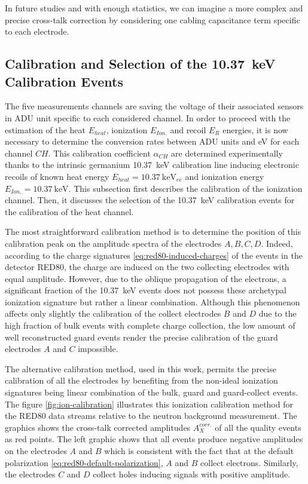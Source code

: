 In future studies and with enough statistics, we can imagine a more complex and precise cross-talk correction by considering one cabling capacitance term specific to each electrode.


\subsection{Calibration and Selection of the \SI{10.37}{\kilo\eV} Calibration Events}
\label{par:ion-calibration}
\label{par:heat-calibration}
\label{par:10kev-selection}

The five measurements channels are saving the voltage of their associated sensors in ADU unit specific to each considered channel. In order to proceed with the estimation of the heat $E_{heat}$, ionization $E_{Ion.}$ and recoil $E_R$ energies, it is now necessary to determine the conversion rates between ADU units and \si{\eV} for each channel $CH$. This calibration coefficient $\alpha_{CH}$ are determined experimentally thanks to the intrinsic germanium \SI{10.37}{\kilo\eV} calibration line inducing electronic recoils of known heat energy $E_{heat} = \SI{10.37}{\kilo\eV_{ee}}$ and ionization energy $E_{Ion.} = \SI{10.37}{\kilo\eV}$. This subsection first describes the calibration of the ionization channel. Then, it discusses the selection of the \SI{10.37}{\kilo\eV} calibration events for the calibration of the heat channel.

The most straightforward calibration method is to determine the position of this calibration peak on the amplitude spectra of the electrodes $A,B,C,D$. Indeed, according to the charge signatures \ref{eq:red80-induced-charges} of the events in the detector RED80, the charge are induced on the two collecting electrodes with equal amplitude. However, due to the oblique propagation of the electrons, a significant fraction of the \SI{10.37}{\kilo\eV} events does not possess these archetypal ionization signature but rather a linear combination. Although this phenomenon affects only slightly the calibration of the collect electrodes $B$ and $D$ due to the high fraction of bulk events with complete charge collection, the low amount of well reconstructed guard events render the precise calibration of the guard electrodes $A$ and $C$ impossible. 

The alternative calibration method, used in this work, permits the precise calibration of all the electrodes by benefiting from the non-ideal ionization signatures being linear combination of the bulk, guard and guard-collect events. The figure \ref{fig:ion-calibration} illustrates this ionization calibration method for the RED80 data streams relative to the neutron background measurement. The graphics shows the cross-talk corrected amplitudes $A_X^{corr.}$ of all the quality events as red points. The left graphic shows that all events produce negative amplitudes on the electrodes $A$ and $B$ which is consistent with the fact that at the default polarization \ref{eq:red80-default-polarization}, $A$ and $B$ collect electrons. Similarly, the electrodes $C$ and $D$ collect holes inducing signals with positive amplitude.

